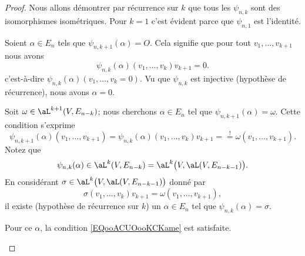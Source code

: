 \begin{proof}
	Nous allons démontrer par récurrence sur \( k\) que tous les \( \psi_{n,k}\) sont des isomorphismes isométriques. Pour \( k=1\) c'est évident parce que \( \psi_{n,1}\) est l'identité.

	\begin{subproof}
		\spitem[Injective]
		Soient \( \alpha\in E_n\) tels que \( \psi_{n,k+1}(\alpha)=O\). Cela signifie que pour tout \( v_1,\ldots, v_{k+1}\) nous avons
		\begin{equation}
			\psi_{n,k}(\alpha)(v_1,\ldots, v_k)v_{k+1}=0.
		\end{equation}
		c'est-à-dire \( \psi_{n,k}(\alpha)(v_1,\ldots, v_{k}=0)\). Vu que \( \psi_{n,k}\) est injective (hypothèse de récurrence), nous avons \( \alpha=0\).

		\spitem[Surjective]
		Soit \( \omega\in \aL^{k+1}(V,E_{n-k})\); nous cherchons \( \alpha\in E_n\) tel que \( \psi_{n,k+1}(\alpha)=\omega\). Cette condition s'exprime
		\begin{equation}        \label{EQooACUOooKCKame}
			\psi_{n,k+1}(\alpha)(v_1,\ldots, v_{k+1})=\psi_{n,k}(\alpha)(v_1,\ldots, v_k)v_{k+1}=\stackrel{!}{=}\omega(v_1,\ldots, v_{k+1}).
		\end{equation}
		Notez que
		\begin{equation}
			\psi_{n,k}(\alpha)\in \aL^k(V,E_{n-k})=\aL^k\big( V,\aL(V,E_{n-k-1}) \big).
		\end{equation}
		En considérant \( \sigma\in \aL^k\big( V,\aL(V,E_{n-k-1}) \big)\) donné par
		\begin{equation}
			\sigma(v_1,\ldots, v_k)v_{k+1}=\omega(v_1,\ldots, v_{k+1}),
		\end{equation}
		il existe (hypothèse de récurrence sur \( k\)) un \( \alpha\in E_n\) tel que \( \psi_{n,k}(\alpha)=\sigma\).

		Pour ce \( \alpha\), la condition \eqref{EQooACUOooKCKame} est satisfaite.


\end{subproof}
\end{proof}
